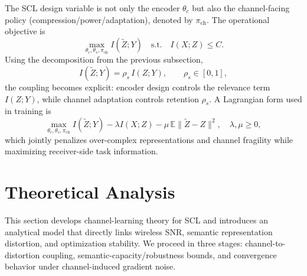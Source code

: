 \documentclass[10pt,journal]{IEEEtran}
\begin{document}
The SCL design variable is not only the encoder $\theta_c$ but also the channel-facing policy (compression/power/adaptation), denoted by $\pi_{\mathrm{ch}}$. The operational objective is
\begin{equation}
\max_{\theta_c,\theta_s,\pi_{\mathrm{ch}}}
I(\tilde{Z};Y)
\quad
\text{s.t.}
\quad
I(X;Z)\le C.
\end{equation}
Using the decomposition from the previous subsection,
\begin{equation}
I(\tilde{Z};Y)=\rho_s\,I(Z;Y),\qquad\rho_s\in[0,1],
\end{equation}
the coupling becomes explicit: encoder design controls the relevance term $I(Z;Y)$, while channel adaptation controls retention $\rho_s$.
A Lagrangian form used in training is
\begin{equation}
\max_{\theta_c,\theta_s,\pi_{\mathrm{ch}}}I(\tilde{Z};Y)-\lambda I(X;Z)-\mu\,\mathbb{E}\|\tilde{Z}-Z\|^2,\quad \lambda,\mu\ge0,
\end{equation}
which jointly penalizes over-complex representations and channel fragility while maximizing receiver-side task information.
\section{Theoretical Analysis}
This section develops channel-learning theory for SCL and introduces an analytical model that directly links wireless SNR, semantic representation distortion, and optimization stability. We proceed in three stages: channel-to-distortion coupling, semantic-capacity/robustness bounds, and convergence behavior under channel-induced gradient noise.
\end{document}

